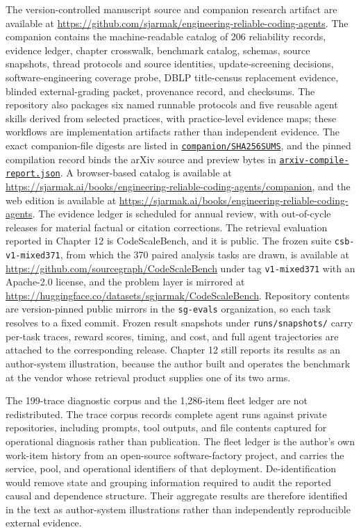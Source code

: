 The version-controlled manuscript source and companion research artifact are available at \url{https://github.com/sjarmak/engineering-reliable-coding-agents}. The companion contains the machine-readable catalog of 206 reliability records, evidence ledger, chapter crosswalk, benchmark catalog, schemas, source snapshots, thread protocols and source identities, update-screening decisions, software-engineering coverage probe, DBLP title-census replacement evidence, blinded external-grading packet, provenance record, and checksums. The repository also packages six named runnable protocols and five reusable agent skills derived from selected practices, with practice-level evidence maps; these workflows are implementation artifacts rather than independent evidence. The exact companion-file digests are listed in \href{https://github.com/sjarmak/engineering-reliable-coding-agents/blob/main/companion/SHA256SUMS}{\texttt{companion/SHA256SUMS}}, and the pinned compilation record binds the arXiv source and preview bytes in \href{https://github.com/sjarmak/engineering-reliable-coding-agents/blob/main/companion/methodology/release-verification/arxiv-compile-report.json}{\texttt{arxiv-compile-report.json}}. A browser-based catalog is available at \url{https://sjarmak.ai/books/engineering-reliable-coding-agents/companion}, and the web edition is available at \url{https://sjarmak.ai/books/engineering-reliable-coding-agents}. The evidence ledger is scheduled for annual review, with out-of-cycle releases for material factual or citation corrections. The retrieval evaluation reported in Chapter 12 is CodeScaleBench, and it is public. The frozen suite \texttt{csb-v1-mixed371}, from which the 370 paired analysis tasks are drawn, is available at \url{https://github.com/sourcegraph/CodeScaleBench} under tag \texttt{v1-mixed371} with an Apache-2.0 license, and the problem layer is mirrored at \url{https://huggingface.co/datasets/sgjarmak/CodeScaleBench}. Repository contents are version-pinned public mirrors in the \texttt{sg-evals} organization, so each task resolves to a fixed commit. Frozen result snapshots under \texttt{runs/snapshots/} carry per-task traces, reward scores, timing, and cost, and full agent trajectories are attached to the corresponding release. Chapter 12 still reports its results as an author-system illustration, because the author built and operates the benchmark at the vendor whose retrieval product supplies one of its two arms.

The 199-trace diagnostic corpus and the 1,286-item fleet ledger are not redistributed. The trace corpus records complete agent runs against private repositories, including prompts, tool outputs, and file contents captured for operational diagnosis rather than publication. The fleet ledger is the author's own work-item history from an open-source software-factory project, and carries the service, pool, and operational identifiers of that deployment. De-identification would remove state and grouping information required to audit the reported causal and dependence structure. Their aggregate results are therefore identified in the text as author-system illustrations rather than independently reproducible external evidence.
